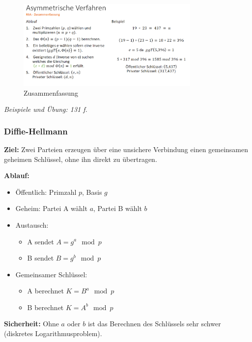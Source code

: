 \documentclass[a4paper,12pt]{article}
\begin{document}
    \begin{figure}[H]
        \centering
        \includegraphics[width=0.8\textwidth]{bilder/rsazusammenfassung.png}
        \caption{Zusammenfassung}
        \label{fig:Zusammenfassung}
    \end{figure}
    \textit{Beispiele und Übung: 131 f. }
\subsubsection{Diffie-Hellmann}
\textbf{Ziel:} Zwei Parteien erzeugen über eine unsichere Verbindung einen gemeinsamen geheimen Schlüssel, ohne ihn direkt zu übertragen.

\vspace{0.3em}
\textbf{Ablauf:}
\begin{itemize}
  \item Öffentlich: Primzahl \( p \), Basis \( g \)
  \item Geheim: Partei A wählt \( a \), Partei B wählt \( b \)
  \item Austausch:
    \begin{itemize}
        \item A sendet \( A = g^a \mod p \)
        \item B sendet \( B = g^b \mod p \)
    \end{itemize}
  \item Gemeinsamer Schlüssel:
    \begin{itemize}
        \item A berechnet \( K = B^a \mod p \)
        \item B berechnet \( K = A^b \mod p \)
    \end{itemize}
\end{itemize}

\vspace{0.3em}
\textbf{Sicherheit:} Ohne \( a \) oder \( b \) ist das Berechnen des Schlüssels sehr schwer (diskretes Logarithmusproblem).
\end{document}
